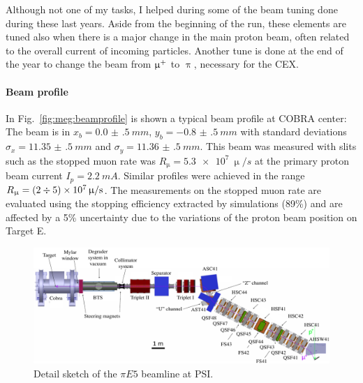 \begin{refsection}
        \noindent
        Although not one of my tasks, I helped during some of the beam tuning done during these last years.
        Aside from the beginning of the run, these elements are tuned also when there is a major change in the main proton beam, often related to the overall current of incoming particles.
        Another tune is done at the end of the year to change the beam from $\upmu^+$ to $\uppi$, necessary for the CEX.
        
        \paragraph{Beam profile}
        In Fig.~\ref{fig:meg:beamprofile} is shown a typical beam profile at COBRA center: The beam is in $x_b = \SI{0.0(5)}{mm}$, $y_b = \SI{-0.8(5)}{mm}$ with standard deviations $\sigma_x = \SI{11.35(50)}{mm}$ and $\sigma_y = \SI{11.36(50)}{mm}$. 
        This beam was measured with slits such as the stopped muon rate was $R_\upmu = \SI{5.3e7}{\upmu \per s}$ at the primary proton beam current $I_p = \SI{2.2}{mA}$. 
        Similar profiles were achieved in the range $R_\upmu = (2 \divisionsymbol 5) \times \SI{e7}{\upmu \per s}$.
        The measurements on the stopped muon rate are evaluated using the stopping efficiency extracted by simulations (89\%) and are affected by a 5\% uncertainty due to the variations of the proton beam position on Target E.

        \begin{figure}
            \centering
            \includegraphics[width = \textwidth]{Figures/MEG/piE5_beamline.png}
            \caption[$\pi E5$: sketch]{Detail sketch of the $\pi E5$ beamline at PSI.}
            \label{fig:pie5}
        \end{figure}
        

\end{refsection}
